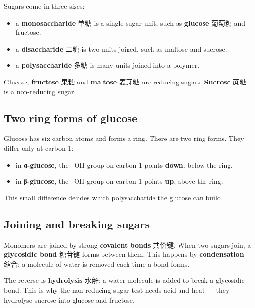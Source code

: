 \documentclass[11pt]{article}
\begin{document}
Sugars come in three sizes:

\begin{itemize}
\item a \textbf{monosaccharide} 单糖 is a single sugar unit, such as \textbf{glucose} 葡萄糖 and fructose.

\item a \textbf{disaccharide} 二糖 is two units joined, such as maltose and sucrose.

\item a \textbf{polysaccharide} 多糖 is many units joined into a polymer.

\end{itemize}

Glucose, \textbf{fructose} 果糖 and \textbf{maltose} 麦芽糖 are reducing sugars. \textbf{Sucrose} 蔗糖 is a non-reducing sugar.

\subsection*{Two ring forms of glucose}

Glucose has six carbon atoms and forms a ring. There are two ring forms. They differ only at carbon 1:

\begin{itemize}
\item in \textbf{α-glucose}, the –OH group on carbon 1 points \textbf{down}, below the ring.

\item in \textbf{β-glucose}, the –OH group on carbon 1 points \textbf{up}, above the ring.

\end{itemize}

This small difference decides which polysaccharide the glucose can build.

\subsection*{Joining and breaking sugars}

Monomers are joined by strong \textbf{covalent bonds} 共价键. When two sugars join, a \textbf{glycosidic bond} 糖苷键 forms between them. This happens by \textbf{condensation} 缩合: a molecule of water is removed each time a bond forms.

The reverse is \textbf{hydrolysis} 水解: a water molecule is added to break a glycosidic bond. This is why the non-reducing sugar test needs acid and heat — they hydrolyse sucrose into glucose and fructose.
\end{document}
